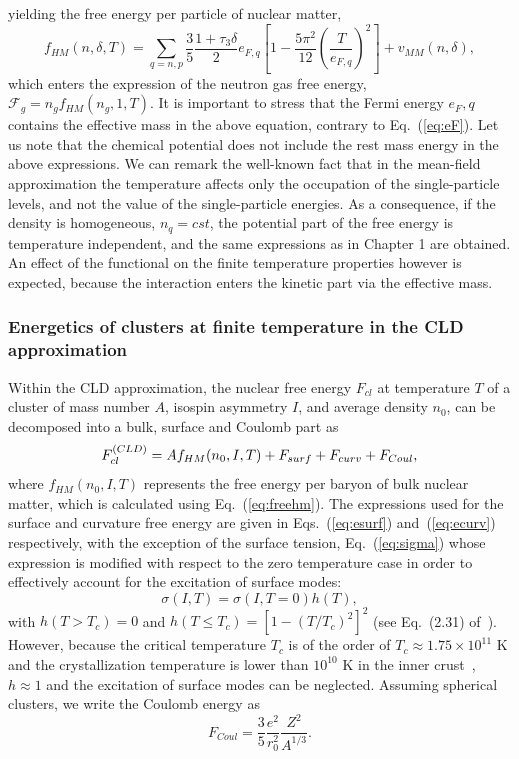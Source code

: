 yielding the free energy per particle of nuclear matter,
%
\begin{equation}
  f_{HM}(n,\delta,T) = \sum_{q=n,p}
  \frac{3}{5}\frac{1+\tau_3\delta}{2}e_{F,q}\left[
  1-\frac{5\pi^2}{12}\left(\frac{T}{e_{F,q}}\right)^2\right] +
  v_{MM}(n,\delta),\label{eq:freehm}
\end{equation}
%
which enters the expression of the neutron gas free energy, $\mathcal{F}_g =
n_g f_{HM}(n_g,1,T)$. {It is important to stress that the Fermi energy 
  $e_F,q$ contains the effective mass in the above equation, contrary to
Eq.~(\ref{eq:eF}).}
Let us note that the chemical potential does not include the rest mass energy 
in the above expressions. 
We can remark the well-known fact that in the mean-field approximation the
temperature affects only the occupation of the single-particle levels, and not
the value of the single-particle energies. As a consequence, if the density is
homogeneous, $n_q = cst$, the potential part of the free energy is temperature
independent, and the same expressions as in Chapter 1 are obtained. An effect
of the functional on the finite temperature properties however is expected,
because the interaction enters the kinetic part via the effective mass.

\subsubsection{Energetics of clusters at finite temperature in the CLD
approximation}

Within the CLD approximation, the nuclear free energy $F_{cl}$ at temperature 
$T$ of a cluster of mass number $A$, isospin asymmetry $I$, and average density 
$n_0$, can be decomposed into a bulk, surface and Coulomb part as
%
\begin{equation}
  F_{cl}^{\text(CLD)} = A f_{HM}(n_0,I,T) + F_{surf} + F_{curv} + F_{Coul},
\end{equation}
%
where $f_{HM}(n_0, I, T)$ represents the free energy per baryon of bulk nuclear
matter, which is calculated using Eq.~(\ref{eq:freehm}).
The expressions used for the surface and curvature free energy are given
in Eqs.~(\ref{eq:esurf}) and~(\ref{eq:ecurv}) respectively, with the exception
of the surface tension, Eq.~(\ref{eq:sigma}) whose expression is modified with 
respect to the zero temperature case in order to effectively account for the 
excitation of surface modes:
%
\begin{equation}
  \sigma(I,T) = \sigma(I, T=0)h(T), 
\end{equation}
%
with $h(T>T_c) = 0$ and $h(T \leq T_c) = [1-(T/T_c)^2]^2$ (see Eq.~(2.31)
of~\cite{Lattimer1991}).
However, because the critical temperature $T_c$ is of the order of 
$T_c \approx 1.75 \times 10^{11}$ K and the crystallization temperature is 
lower than $10^{10}$ K in the inner crust~\cite{Haensel2007}, $h\approx 1$ and 
the excitation of surface modes can be neglected.
Assuming spherical clusters, we write the Coulomb energy as
%
\begin{equation}
  F_{Coul} = \frac{3}{5}\frac{e^2}{r_0^2}\frac{Z^2}{A^{1/3}}.
\end{equation}
%

